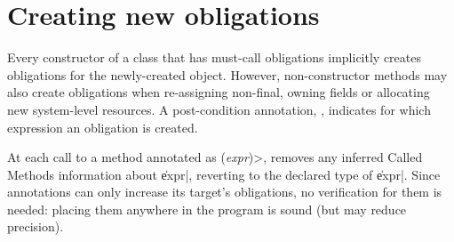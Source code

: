 \section{Creating new obligations}
\label{sec:reset-must-call}

Every constructor of a class that has must-call obligations
implicitly creates obligations for the newly-created object.
However, non-constructor methods may also create obligations
when re-assigning non-final, owning fields or allocating
new system-level resources.
A post-condition annotation,
\ResetMustCall,
indicates for which expression an obligation is created.

At each call to a method annotated as \ResetMustCall\<(\emph{expr})>, \Tool removes any
inferred Called Methods information about \|expr|, reverting to
the declared type of \|expr|.
Since \ResetMustCall annotations can only increase its target's obligations,
no verification for them is needed: placing them anywhere in the program is sound
(but may reduce precision).

